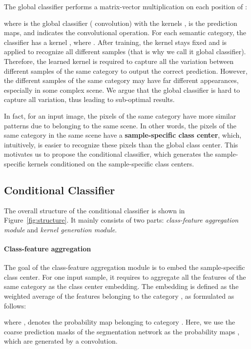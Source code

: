 \documentclass[journal]{IEEEtran}
\begin{document}
The global classifier performs a matrix-vector
multiplication on each position of :

where  is the global classifier ( convolution) with the kernels ,  is the prediction maps, and  indicates the convolutional operation.
For each semantic category,
the classifier has a kernel , where .
After training, the kernel stays fixed and 
is applied to recognize all different samples 
(that is why we call it global classifier).
Therefore,
the learned kernel is required to 
capture all the variation between different samples of the same category 
to output the correct prediction.
However, 
the different samples of the same category 
may have far different appearances, 
especially in some complex scene.
We argue that 
the global classifier is hard to 
capture all variation, 
thus leading to sub-optimal results.

In fact, 
for an input image,
the pixels of the same category
have more similar patterns 
due to belonging to the same scene.
In other words,
the pixels of the same category
in the same scene
have a \textbf{sample-specific class center},
which, intuitively, is easier to recognize these pixels 
than the global class center. 
This motivates us 
to propose the conditional classifier,
which generates the sample-specific kernels 
conditioned on the sample-specific class centers.



\subsection{Conditional Classifier}
The overall structure of the conditional classifier
is shown in Figure~\ref{fig:structure}.
It mainly consists of two parts:
\emph{class-feature aggregation module}
and 
\emph{kernel generation module}.

\paragraph{Class-feature aggregation}
The goal of the class-feature aggregation module
is to embed the sample-specific class center.
For one input sample,
it requires to aggregate 
all the features of the same category 
as the class center embedding.
The embedding  
is defined as the weighted average of the features 
belonging to the category , as formulated as follows:

where ,  denotes the probability map belonging to category .
Here, we use the coarse prediction masks of the segmentation network as the probability maps ,
which are generated by a  convolution.
\end{document}
